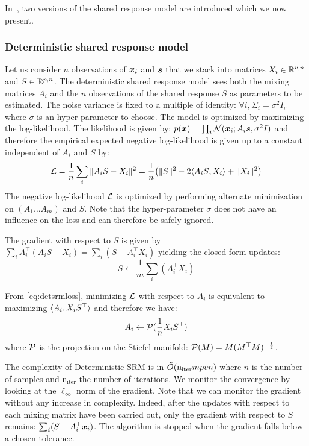 In~\cite{chen2015reduced, anderson2016enabling}, two versions of the shared response model are
introduced which we now present.
\subsubsection{Deterministic shared response model}
\label{sec:deterministicsrm}
Let us consider $n$ observations of $\boldsymbol{x}_i$ and $\boldsymbol{s}$ that we stack into
matrices $X_i \in \mathbb{R}^{v, n}$ and $S \in \mathbb{R}^{p, n}$.
The deterministic shared response model sees both the mixing matrices $A_i$ and
the $n$ observations of the shared response $S$ as parameters to be
estimated. The noise variance is fixed to a multiple of identity: $\forall i,
\Sigma_i=\sigma^2 I_v$ where $\sigma$ is an hyper-parameter to choose.
The model is optimized by maximizing the log-likelihood.
The likelihood is given by: $p(\boldsymbol{x}) = \prod_i \mathcal{N}(\boldsymbol{x}_i; A_i \boldsymbol{s}, \sigma^2 I)$ and
therefore the empirical expected negative log-likelihood is given up to a constant independent of
$A_i$ and $S$ by:
\begin{align}
  \mathcal{L} = \frac1{n} \sum_i \|A_i S - X_i \|^2 = \frac1{n} \big(\| S \|^2 -2 \langle{ A_i S},{ X_i }\rangle + \| X_i \|^2 \big)
  \label{eq:detsrmloss}
\end{align}
The negative log-likelihood $\mathcal{L}$ is optimized by performing alternate minimization on $(A_1 \dots A_m)$
and $S$. Note that the hyper-parameter $\sigma$ does not have an influence on
the loss and can therefore be safely ignored.

The gradient with respect to $S$ is given by $\sum_i A_i^{\top}(A_i S -
X_i) = \sum_i (S -
A_i^{\top} X_i)$
yielding the closed form updates:
\begin{equation}
  S \leftarrow  \frac1m \sum_i (A_i^{\top} X_i)
  \label{eq:srm:supdate}
\end{equation}

From \eqref{eq:detsrmloss}, minimizing $\mathcal{L}$ with respect to $A_i$ is
equivalent to maximizing $\langle{ A_i},{ X_i S^{\top} }\rangle$ and therefore we
have:
\begin{equation}
  A_i \leftarrow  \mathcal{P}(\frac1{n}X_i S^{\top})
  \label{eq:detsrm:Aiupdate}
\end{equation}
where $\mathcal{P}$ is the projection on the Stiefel manifold: $\mathcal{P}(M) = M
(M^{\top}M)^{-\frac12}$.

The complexity of Deterministic SRM is in $\tilde{O}(\mathrm{n_{iter}} mpvn)$ where
$n$ is the number of samples and $\mathrm{n_{iter}}$ the number of iterations.
We monitor the convergence by looking at the $\ell_{\infty}$ norm of the
gradient. Note that we can monitor the gradient without any increase in complexity.
Indeed, after the updates with respect to each mixing matrix have been
carried out, only the gradient with respect to $S$ remains: $\sum_i
(S - A_i^{\top}\boldsymbol{x}_i)$. The algorithm is stopped when the
gradient falls below a chosen tolerance.

